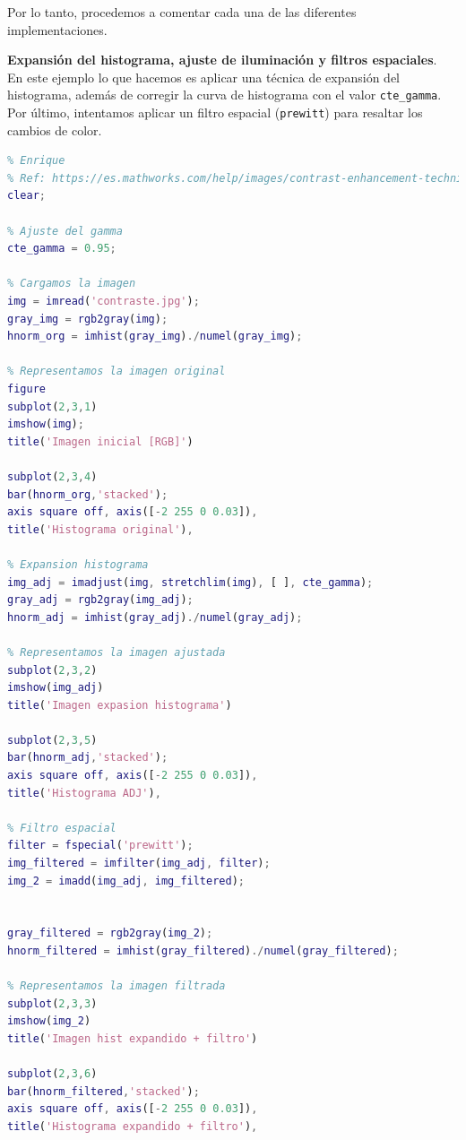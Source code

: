 \documentclass[12pt]{article}
\begin{document}
	\noindent Por lo tanto, procedemos a comentar cada una de las diferentes implementaciones.
	
	\pagebreak
	
	\noindent \textbf{\large Expansión del histograma, ajuste de iluminación y filtros espaciales}. \\ 
	
	\noindent En este ejemplo lo que hacemos es aplicar una técnica de expansión del histograma, además de corregir la curva de histograma con el valor \texttt{cte\_gamma}. Por último, intentamos aplicar un filtro espacial (\texttt{prewitt}) para resaltar los cambios de color.
	
	\vspace{10px}
	
	\begin{lstlisting}[language=Matlab, caption={Implementación contraste con expansión de histograma en \texttt{MATLAB}}]
% 2 - Contraste 
% Enrique
% Ref: https://es.mathworks.com/help/images/contrast-enhancement-techniques.html
clear;

% Ajuste del gamma
cte_gamma = 0.95;

% Cargamos la imagen
img = imread('contraste.jpg');
gray_img = rgb2gray(img);
hnorm_org = imhist(gray_img)./numel(gray_img);

% Representamos la imagen original
figure
subplot(2,3,1)
imshow(img);
title('Imagen inicial [RGB]')

subplot(2,3,4)
bar(hnorm_org,'stacked'); 
axis square off, axis([-2 255 0 0.03]), 
title('Histograma original'), 

% Expansion histograma
img_adj = imadjust(img, stretchlim(img), [ ], cte_gamma);
gray_adj = rgb2gray(img_adj);
hnorm_adj = imhist(gray_adj)./numel(gray_adj);

% Representamos la imagen ajustada
subplot(2,3,2)
imshow(img_adj)
title('Imagen expasion histograma')

subplot(2,3,5)
bar(hnorm_adj,'stacked'); 
axis square off, axis([-2 255 0 0.03]), 
title('Histograma ADJ'), 

% Filtro espacial
filter = fspecial('prewitt');
img_filtered = imfilter(img_adj, filter);
img_2 = imadd(img_adj, img_filtered);


gray_filtered = rgb2gray(img_2);
hnorm_filtered = imhist(gray_filtered)./numel(gray_filtered);

% Representamos la imagen filtrada
subplot(2,3,3)
imshow(img_2)
title('Imagen hist expandido + filtro')

subplot(2,3,6)
bar(hnorm_filtered,'stacked'); 
axis square off, axis([-2 255 0 0.03]), 
title('Histograma expandido + filtro'), 
	\end{lstlisting}
\end{document}
